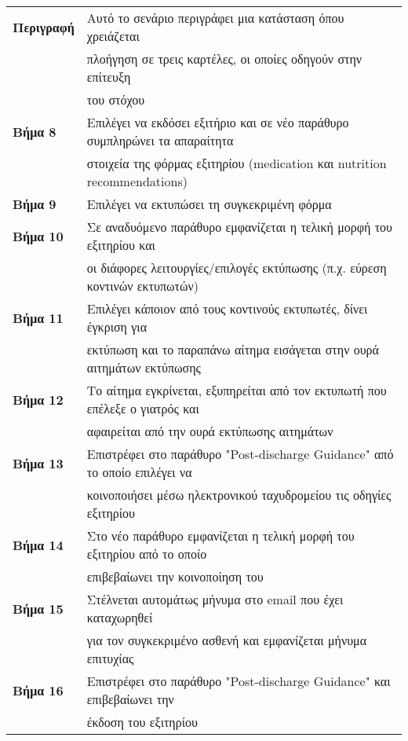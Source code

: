 \documentclass{article}
\newcommand\T{\rule{0pt}{2.6ex}}       %
\newcommand\B{\rule[-1.2ex]{0pt}{0pt}}
\begin{document}
 \begin{center}
     \begin{tabular}{|l|l|}
     \hline
      \textbf{Περιγραφή} & Αυτό το σενάριο περιγράφει μια κατάσταση όπου χρειάζεται \T \\& πλοήγηση σε τρεις καρτέλες, οι οποίες οδηγούν στην επίτευξη \\& του στόχου \B \\ 
      \hline
      \textbf{Βήμα 8} & Επιλέγει να εκδόσει εξιτήριο και σε νέο παράθυρο συμπληρώνει τα απαραίτητα \T \\& στοιχεία της φόρμας εξιτηρίου (medication και nutrition recommendations) \B \\
      \hline
      \textbf{Βήμα 9} & Επιλέγει να εκτυπώσει τη συγκεκριμένη φόρμα \T\B \\
      \hline
      \textbf{Βήμα 10} & Σε αναδυόμενο παράθυρο εμφανίζεται η τελική μορφή του εξιτηρίου και \T \\& οι διάφορες λειτουργίες/επιλογές εκτύπωσης (π.χ. εύρεση κοντινών εκτυπωτών) \B \\
      \hline
      \textbf{Βήμα 11} & Επιλέγει κάποιον από τους κοντινούς εκτυπωτές, δίνει έγκριση για \T \\& εκτύπωση και το παραπάνω αίτημα εισάγεται στην ουρά αιτημάτων εκτύπωσης  \B \\
      \hline
      \textbf{Βήμα 12} & Το αίτημα εγκρίνεται, εξυπηρείται από τον εκτυπωτή που επέλεξε ο γιατρός και \T \\& αφαιρείται από την ουρά εκτύπωσης αιτημάτων \B \\
      \hline
      \textbf{Βήμα 13} & Επιστρέφει στο παράθυρο "Post-discharge Guidance" από το οποίο επιλέγει να \T \\& κοινοποιήσει μέσω ηλεκτρονικού ταχυδρομείου τις οδηγίες εξιτηρίου \B \\
      \hline
      \textbf{Βήμα 14} & Στο νέο παράθυρο εμφανίζεται η τελική μορφή του εξιτηρίου από το οποίο \T\\&επιβεβαίωνει την κοινοποίηση του \B \\
      \hline
      \textbf{Βήμα 15} & Στέλνεται αυτομάτως μήνυμα στο email που έχει καταχωρηθεί \T \\& για τον συγκεκριμένο ασθενή και εμφανίζεται μήνυμα επιτυχίας \B \\
      \hline
      \textbf{Βήμα 16} & Επιστρέφει στο παράθυρο "Post-discharge Guidance" και επιβεβαίωνει την \T \\&  έκδοση του εξιτηρίου  \B \\   

\end{tabular}
\end{center}
\end{document}
